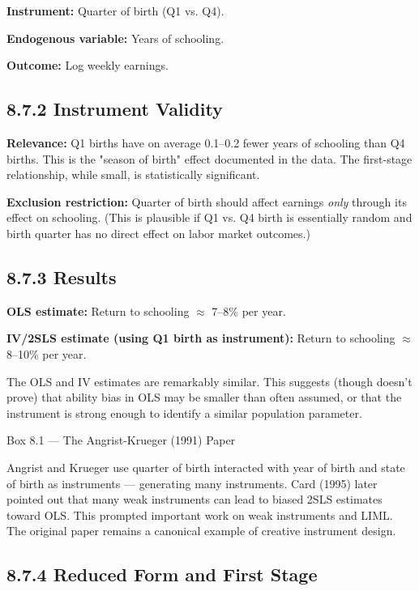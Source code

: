 \textbf{Instrument:} Quarter of birth (Q1 vs. Q4).

\textbf{Endogenous variable:} Years of schooling.

\textbf{Outcome:} Log weekly earnings.

\subsection{8.7.2 Instrument Validity}

\textbf{Relevance:} Q1 births have on average 0.1--0.2 fewer years of schooling than Q4 births. This is the "season of birth" effect documented in the data. The first-stage relationship, while small, is statistically significant.

\textbf{Exclusion restriction:} Quarter of birth should affect earnings \textit{only} through its effect on schooling. (This is plausible if Q1 vs. Q4 birth is essentially random and birth quarter has no direct effect on labor market outcomes.)

\subsection{8.7.3 Results}

\textbf{OLS estimate:} Return to schooling $\approx$ 7--8\% per year.

\textbf{IV/2SLS estimate (using Q1 birth as instrument):} Return to schooling $\approx$ 8--10\% per year.

The OLS and IV estimates are remarkably similar. This suggests (though doesn't prove) that ability bias in OLS may be smaller than often assumed, or that the instrument is strong enough to identify a similar population parameter.

\begin{keybox}{Box 8.1 --- The Angrist-Krueger (1991) Paper}

Angrist and Krueger use quarter of birth interacted with year of birth and state of birth as instruments --- generating many instruments. Card (1995) later pointed out that many weak instruments can lead to biased 2SLS estimates toward OLS. This prompted important work on weak instruments and LIML. The original paper remains a canonical example of creative instrument design.
\end{keybox}

\subsection{8.7.4 Reduced Form and First Stage}

